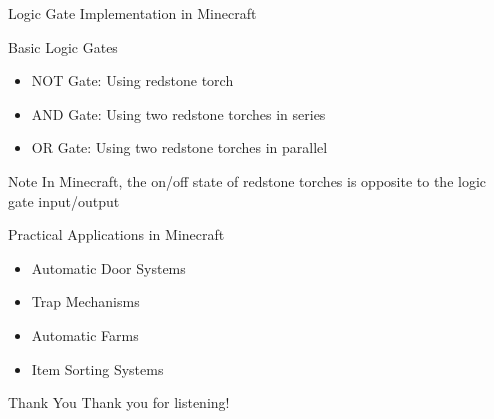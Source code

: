 \documentclass{beamer}
\begin{document}
\begin{frame}{Logic Gate Implementation in Minecraft}
    \begin{block}{Basic Logic Gates}
        \begin{itemize}
            \item NOT Gate: Using redstone torch
            \item AND Gate: Using two redstone torches in series
            \item OR Gate: Using two redstone torches in parallel
        \end{itemize}
    \end{block}
    
    \begin{alertblock}{Note}
        In Minecraft, the on/off state of redstone torches is opposite to the logic gate input/output
    \end{alertblock}
\end{frame}

\begin{frame}{Practical Applications in Minecraft}
    \begin{itemize}
        \item Automatic Door Systems
        \item Trap Mechanisms
        \item Automatic Farms
        \item Item Sorting Systems
    \end{itemize}
\end{frame}

\begin{frame}{Thank You}
    \centering
    Thank you for listening!
\end{frame}
\end{document}
